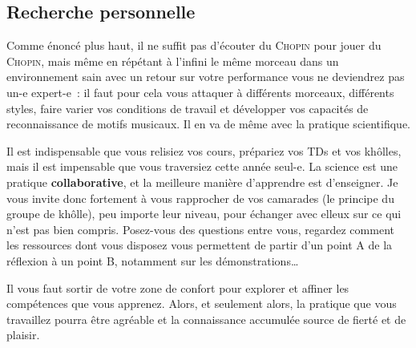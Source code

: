 \documentclass[a4paper, 12pt, garamond]{book}
\begin{document}
\subsection{Recherche personnelle}

Comme énoncé plus haut, il ne suffit pas d'écouter du \textsc{Chopin} pour jouer
du \textsc{Chopin}, mais même en répétant à l'infini le même morceau dans un
environnement sain avec un retour sur votre performance vous ne deviendrez pas
un-e expert-e~: il faut pour cela vous attaquer à différents morceaux,
différents styles, faire varier vos conditions de travail et développer vos
capacités de reconnaissance de motifs musicaux. Il en va de même avec la
pratique scientifique.


Il est indispensable que vous relisiez vos cours, prépariez vos TDs et vos
khôlles, mais il est impensable que vous traversiez cette année seul-e. La
science est une pratique \textbf{collaborative}, et la meilleure manière
d'apprendre est d'enseigner. Je vous invite donc fortement à vous
rapprocher de vos camarades (le principe du groupe de khôlle), peu importe leur
niveau, pour échanger avec elleux sur ce qui n'est pas bien compris. Posez-vous
des questions entre vous, regardez comment les ressources dont vous disposez
vous permettent de partir d'un point A de la réflexion à un point B, notamment
sur les démonstrations…

Il vous faut sortir de votre zone de confort pour explorer et affiner les
compétences que vous apprenez. Alors, et seulement alors, la pratique que vous
travaillez pourra être agréable et la connaissance accumulée source de fierté et
de plaisir.
\end{document}
